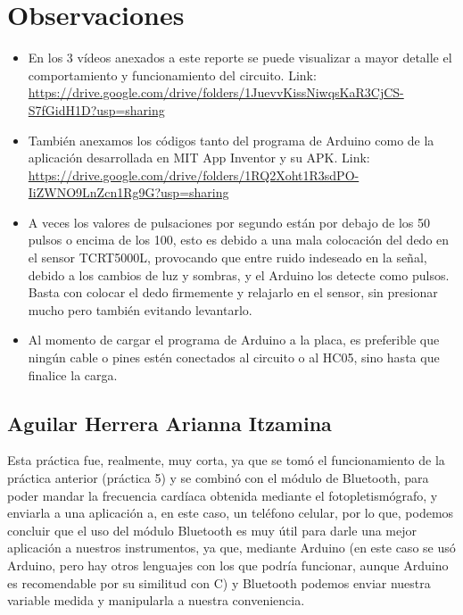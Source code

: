 \documentclass[12pt]{article}
\begin{document}
    \section{Observaciones}
    \begin{itemize}
    
    \item[\checkmark] En los 3 vídeos anexados a este reporte se puede visualizar a mayor detalle el \\ comportamiento y funcionamiento del circuito. Link: \textcolor{blue}{\url{https://drive.google.com/drive/folders/1JuevvKissNiwqsKaR3CjCS-S7fGidH1D?usp=sharing}}
    
    \item[\checkmark] También anexamos los códigos tanto del programa de Arduino como de la aplicación desarrollada en MIT App Inventor y su APK. Link: \textcolor{blue}{\url{https://drive.google.com/drive/folders/1RQ2Xoht1R3sdPO-IiZWNO9LnZcn1Rg9G?usp=sharing}}
    
    \item[\checkmark] A veces los valores de pulsaciones por segundo están por debajo de los 50 pulsos o encima de los 100, esto es debido a una mala colocación del dedo en el sensor TCRT5000L, provocando que entre ruido indeseado en la señal, debido a los cambios de luz y sombras, y el Arduino los detecte como pulsos. Basta con colocar el dedo firmemente y relajarlo en el sensor, sin presionar mucho pero también evitando levantarlo.
    \item[\checkmark] Al momento de cargar el programa de Arduino a la placa, es preferible que ningún cable o pines estén conectados al circuito o al HC05, sino hasta que finalice la carga.
    \end{itemize}
    

    \subsection{ Aguilar Herrera Arianna Itzamina}
        Esta práctica fue, realmente, muy corta, ya que se tomó el funcionamiento de la práctica anterior (práctica 5) y se combinó con el módulo de Bluetooth, para poder mandar la frecuencia cardíaca obtenida mediante el fotopletismógrafo, y enviarla a una aplicación a, en este caso, un teléfono celular, por lo que, podemos concluir que el uso del módulo Bluetooth es muy útil para darle una mejor aplicación a nuestros instrumentos, ya que, mediante Arduino (en este caso se usó Arduino, pero hay otros lenguajes con los que podría funcionar, aunque Arduino es recomendable por su similitud con C) y Bluetooth podemos enviar nuestra variable medida y manipularla a nuestra conveniencia.
    
\end{document}
